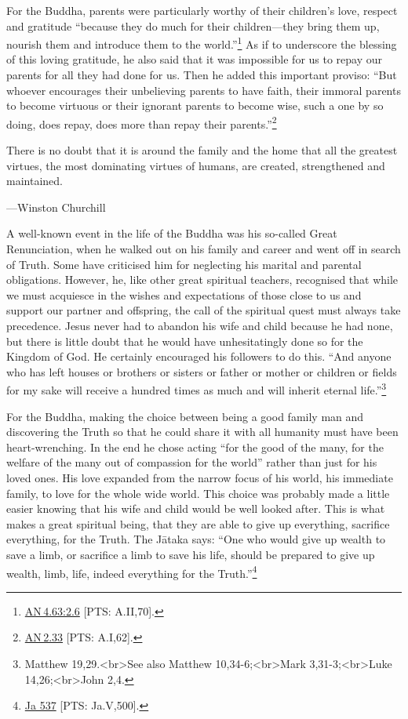 \documentclass[10pt, openright]{book}
\newenvironment{epigram-2}%
{%
\vspace{1em}
\noindent
\quoting[leftmargin=2.5cm,rightmargin=2.5cm]%
\begin{itshape}
\large
}%
{\end{itshape}\endquoting
}%
\newenvironment{epigram-2-cite}%
{%
\quoting[leftmargin=2.5cm,rightmargin=2.5cm]%
\noindent\normal\hspace*{\fill} 
}%
{\endquoting\vspace{1em}
}%
\begin{document}
For the Buddha, parents were particularly worthy of their children’s love, respect and gratitude “because they do much for their children—they bring them up, nourish them and introduce them to the world.”\footnote {\href{https://suttacentral.net/an4.63/en/sujato\#2.6}{AN 4.63:2.6} [PTS: A.II,70].} As if to underscore the blessing of this loving gratitude, he also said that it was impossible for us to repay our parents for all they had done for us. Then he added this important proviso: “But whoever encourages their unbelieving parents to have faith, their immoral parents to become virtuous or their ignorant parents to become wise, such a one by so doing, does repay, does more than repay their parents.”\footnote {\href{https://suttacentral.net/an2.33/en/sujato}{AN 2.33} [PTS: A.I,62].}


\begin{epigram-2}
There is no doubt that it is around the family and the home that all the greatest virtues, the most dominating virtues of humans, are created, strengthened and maintained.
\end{epigram-2}

\begin{epigram-2-cite}
—Winston Churchill
\end{epigram-2-cite}

A well-known event in the life of the Buddha was his so-called Great Renunciation, when he walked out on his family and career and went off in search of Truth. Some have criticised him for neglecting his marital and parental obligations. However, he, like other great spiritual teachers, recognised that while we must acquiesce in the wishes and expectations of those close to us and support our partner and offspring, the call of the spiritual quest must always take precedence. Jesus never had to abandon his wife and child because he had none, but there is little doubt that he would have unhesitatingly done so for the Kingdom of God. He certainly encouraged his followers to do this. “And anyone who has left houses or brothers or sisters or father or mother or children or fields for my sake will receive a hundred times as much and will inherit eternal life.”\footnote {Matthew 19,29.<br>See also Matthew 10,34-6;<br>Mark 3,31-3;<br>Luke 14,26;<br>John 2,4.}


For the Buddha, making the choice between being a good family man and discovering the Truth so that he could share it with all humanity must have been heart-wrenching. In the end he chose acting “for the good of the many, for the welfare of the many out of compassion for the world” rather than just for his loved ones. His love expanded from the narrow focus of his world, his immediate family, to love for the whole wide world. This choice was probably made a little easier knowing that his wife and child would be well looked after. This is what makes a great spiritual being, that they are able to give up everything, sacrifice everything, for the Truth. The Jātaka says: “One who would give up wealth to save a limb, or sacrifice a limb to save his life, should be prepared to give up wealth, limb, life, indeed everything for the Truth.”\footnote {\href{https://suttacentral.net/ja537/en/francis?reference=main/pts#pts-vp-pli500}{Ja 537} [PTS: Ja.V,500].}
\end{document}
